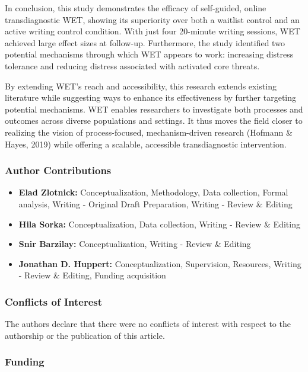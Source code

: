 \documentclass[
  man,floatsintext]{apa7}
\providecommand{\tightlist}{%
  \setlength{\itemsep}{0pt}\setlength{\parskip}{0pt}}
\begin{document}
In conclusion, this study demonstrates the efficacy of self-guided, online transdiagnostic WET, showing its superiority over both a waitlist control and an active writing control condition.
With just four 20-minute writing sessions, WET achieved large effect sizes at follow-up.
Furthermore, the study identified two potential mechanisms through which WET appears to work: increasing distress tolerance and reducing distress associated with activated core threats.

By extending WET's reach and accessibility, this research extends existing literature while suggesting ways to enhance its effectiveness by further targeting potential mechanisms.
WET enables researchers to investigate both processes and outcomes across diverse populations and settings.
It thus moves the field closer to realizing the vision of process-focused, mechanism-driven research (Hofmann \& Hayes, 2019) while offering a scalable, accessible transdiagnostic intervention.

\newpage

\subsubsection{Author Contributions}\label{author-contributions}

\begin{itemize}
\tightlist
\item
  \textbf{Elad Zlotnick:} Conceptualization, Methodology, Data collection, Formal analysis, Writing - Original Draft Preparation, Writing - Review \& Editing
\item
  \textbf{Hila Sorka:} Conceptualization, Data collection, Writing - Review \& Editing
\item
  \textbf{Snir Barzilay:} Conceptualization, Writing - Review \& Editing
\item
  \textbf{Jonathan D. Huppert:} Conceptualization, Supervision, Resources, Writing - Review \& Editing, Funding acquisition
\end{itemize}

\subsubsection{Conflicts of Interest}\label{conflicts-of-interest}

The authors declare that there were no conflicts of interest with respect to the authorship or the publication of this article.

\subsubsection{Funding}\label{funding}
\end{document}
